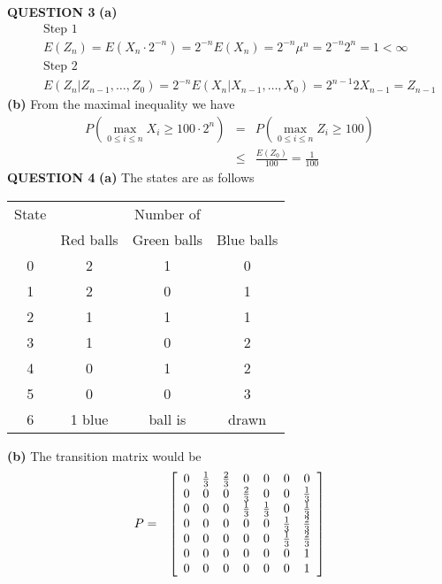 \documentclass{amsart}
\theoremstyle{definition}
\theoremstyle{remark}
\numberwithin{equation}{section}
\begin{document}
{\bf QUESTION 3}
\newline
{\bf (a)}
\newline
\begin{eqnarray}
\nonumber && \text{Step 1} \\
\nonumber && E\left(Z_n\right)= E\left(X_n \cdot 2^{-n}\right)=2^{-n}E\left(X_n\right)=2^{-n} \mu^n=2^{-n}2^n=1 < \infty \\
\nonumber && \text{Step 2} \\
\nonumber && E\left(Z_n | Z_{n-1},\ldots,Z_0\right)=2^{-n}E\left(X_n |X_{n-1},\ldots,X_0\right)=2^{n-1}2X_{n-1}=Z_{n-1}
\end{eqnarray}
\newline
{\bf (b)} From the maximal inequality we have
\begin{eqnarray}
\nonumber P\left(\max_{0\le i \le n} X_i \ge 100\cdot 2^n \right) &=&P\left(\max_{0\le i \le n} Z_i \ge 100 \right) \\
\nonumber &\le& \frac{E(Z_0)}{100}=\frac{1}{100} 
\end{eqnarray}
\bigskip
{\bf QUESTION 4}
\newline
{\bf (a)}
\newline
The states are as follows
\begin{table}[h]
\centering
\begin{tabular}{|c|ccc|}
\hline
State  & & Number of & \\
& Red balls & Green balls & Blue balls \\
\hline
0 & 2 & 1 & 0 \\
1 & 2 & 0 & 1 \\
2 & 1 & 1 & 1 \\
3 & 1 & 0 & 2 \\
4 & 0 & 1 & 2 \\
5 & 0 & 0 & 3 \\
6 & 1 blue & ball is & drawn \\
\hline
\end{tabular}
\end{table}
\newline
{\bf (b)}
The transition matrix would be
\begin{eqnarray}
\nonumber P&=&\left[
\begin{array}[6]{ccccccc}
0 & \frac{1}{3} & \frac{2}{3} & 0 & 0 & 0 & 0  \\
0 & 0 & 0 & \frac{2}{3} & 0 & 0 & \frac{1}{3}  \\
0 & 0 & 0 & \frac{1}{3} & \frac{1}{3} & 0 & \frac{1}{3}  \\
0 & 0 & 0 & 0 & 0 & \frac{1}{3} & \frac{2}{3}  \\
0 & 0 & 0 & 0 & 0 & \frac{1}{3} & \frac{2}{3}  \\
0 & 0 & 0 & 0 & 0 & 0 & 1  \\
0 & 0 & 0 & 0 & 0 & 0 & 1  \\
\end{array}
\right]
\end{eqnarray}
\end{document}
